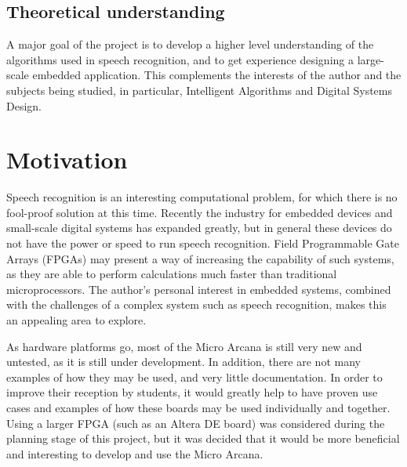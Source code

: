 	\subsection{Theoretical understanding} %
	\label{sec:theoretical_understanding}
		A major goal of the project is to develop a higher level understanding of the algorithms used in speech recognition, and to get experience designing a large-scale embedded application.  This complements the interests of the author and the subjects being studied, in particular, Intelligent Algorithms and Digital Systems Design.


\section{Motivation} %
\label{sec:motivation}
	Speech recognition is an interesting computational problem, for which there is no fool-proof solution at this time.  Recently the industry for embedded devices and small-scale digital systems has expanded greatly, but in general these devices do not have the power or speed to run speech recognition.  Field Programmable Gate Arrays (FPGAs) may present a way of increasing the capability of such systems, as they are able to perform calculations much faster than traditional microprocessors.  The author's personal interest in embedded systems, combined with the challenges of a complex system such as speech recognition, makes this an appealing area to explore.

	As hardware platforms go, most of the Micro Arcana is still very new and untested, as it is still under development.  In addition, there are not many examples of how they may be used, and very little documentation.  In order to improve their reception by students, it would greatly help to have proven use cases and examples of how these boards may be used individually and together.  Using a larger FPGA (such as an Altera DE board) was considered during the planning stage of this project, but it was decided that it would be more beneficial and interesting to develop and use the Micro Arcana.


